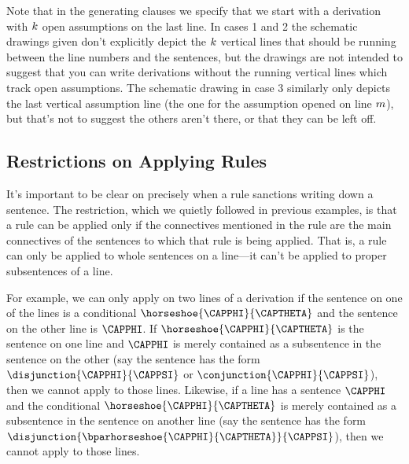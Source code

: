 \noindent{}Note that in the generating clauses we specify that we start with a derivation with $k$ open assumptions on the last line. 
In cases 1 and 2 the schematic drawings given don't explicitly depict the $k$ vertical lines that should be running between the line numbers and the sentences, but the drawings are not intended to suggest that you can write derivations without the running vertical lines which track open assumptions. 
The schematic drawing in case 3 similarly only depicts the last vertical assumption line (the one for the assumption opened on line $m$), but that's not to suggest the others aren't there, or that they can be left off.   

\subsection{Restrictions on Applying Rules}\label{Restrictions on Applying Rules}
It's important to be clear on precisely when a rule sanctions writing down a sentence. 
The restriction, which we quietly followed in previous examples, is that a rule can be applied only if the connectives mentioned in the rule are the main connectives of the sentences to which that rule is being applied.
That is, a rule can only be applied to whole sentences on a line---it can't be applied to proper subsentences of a line.

For example, we can only apply  on two lines of a derivation if the sentence on one of the lines is a conditional $\horseshoe{\CAPPHI}{\CAPTHETA}$ and the sentence on the other line is $\CAPPHI$. 
If $\horseshoe{\CAPPHI}{\CAPTHETA}$ is the sentence on one line and $\CAPPHI$ is merely contained as a subsentence in the sentence on the other (say the sentence has the form $\disjunction{\CAPPHI}{\CAPPSI}$ or $\conjunction{\CAPPHI}{\CAPPSI}$), then we cannot apply  to those lines. 
Likewise, if a line has a sentence $\CAPPHI$ and the conditional $\horseshoe{\CAPPHI}{\CAPTHETA}$ is merely contained as a subsentence in the sentence on another line (say the sentence has the form $\disjunction{\bparhorseshoe{\CAPPHI}{\CAPTHETA}}{\CAPPSI}$), then we cannot apply  to those lines.


